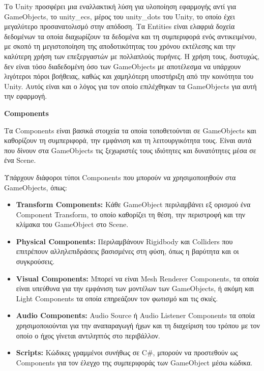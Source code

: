 Το Unity προσφέρει μια εναλλακτική λύση για υλοποίηση εφαρμογής αντί για GameObjects, το \acrfull{unity_ecs}\cite{noauthor_entity_nodate}, μέρος του \acrfull{unity_dots} του Unity\cite{noauthor_dots_nodate}, το οποίο έχει μεγαλύτερο προσανατολισμό στην απόδοση. Τα Entities είναι ελαφριά δοχεία δεδομένων τα οποία διαχωρίζουν τα δεδομένα και τη συμπεριφορά ενός αντικειμένου, με σκοπό τη μεγιστοποίηση της αποδοτικότητας του χρόνου εκτέλεσης και την καλύτερη χρήση των επεξεργαστών με πολλαπλούς πυρήνες. Η χρήση τους, δυστυχώς, δεν είναι τόσο διαδεδομένη όσο των GameObjects με αποτέλεσμα να υπάρχουν λιγότεροι πόροι βοήθειας, καθώς και χαμηλότερη υποστήριξη από την κοινότητα του Unity. Αυτός είναι και ο λόγος για τον οποίο επιλέχθηκαν τα GameObjects για αυτή την εφαρμογή.

\textbf{Components}

Τα Components είναι βασικά στοιχεία τα οποία τοποθετούνται σε GameObjects και καθορίζουν τη συμπεριφορά, την εμφάνιση και τη λειτουργικότητα τους. Είναι αυτά που δίνουν στα GameObjects τις ξεχωριστές τους ιδιότητες και δυνατότητες μέσα σε ένα Scene.

Υπάρχουν διάφοροι τύποι Components που μπορούν να χρησιμοποιηθούν στα GameObjects, όπως:

\begin{itemize}
    \item \textbf{Transform Components:} Κάθε GameObject περιλαμβάνει εξ ορισμού ένα Component Transform, το οποίο καθορίζει τη θέση, την περιστροφή και την κλίμακα του GameObject στο Scene.
    \item \textbf{Physical Components:} Περιλαμβάνουν Rigidbody και Colliders που επιτρέπουν αλληλεπιδράσεις βασισμένες στη φύση, όπως η βαρύτητα και οι συγκρούσεις.
    \item \textbf{Visual Components:} Μπορεί να είναι Mesh Renderer Components, τα οποία είναι υπεύθυνα για την εμφάνιση των μοντέλων των GameObjects, ή ακόμη και Light Components τα οποία επηρεάζουν τον φωτισμό και τις σκιές.
    \item \textbf{Audio Components:} Audio Source ή Audio Listener Components τα οποία χρησιμοποιούνται για την αναπαραγωγή ήχων και τη διαχείριση του τρόπου με τον οποίο ο ήχος γίνεται αντιληπτός στο περιβάλλον.
    \item \textbf{Scripts:} Κώδικες γραμμένοι συνήθως σε C\#\cite{noauthor_c_nodate}, μπορούν να προστεθούν ως Components για τον έλεγχο της συμπεριφοράς των GameObject μέσω κώδικα.
\end{itemize}

